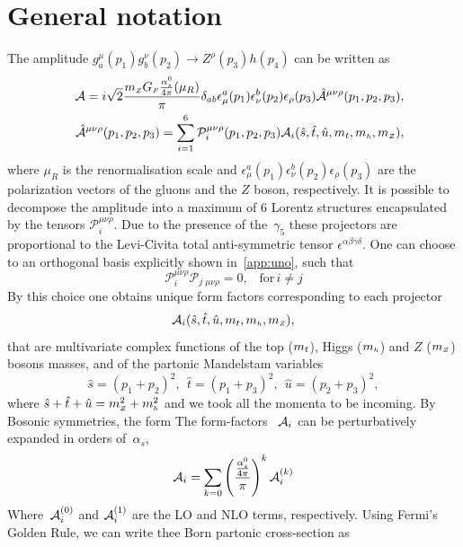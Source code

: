 \section{General notation \label{chap6sec:GenNot} }
\par The amplitude  $g^\mu_a(p_1)g^\nu_b(p_2)\to Z^\rho(p_3) h(p_4)$ can be written as
\begin{align}
&&{\cal A}=i \sqrt{2}\frac{m_{ \scriptscriptstyle Z} G_{ \scriptscriptstyle F} \frac{\alpha_s^0}{4 \pi}(\mu_R)}{\pi}\delta_{ab}\epsilon^a_\mu(p_1)
\epsilon^b_\nu(p_2)\epsilon_\rho(p_3)\hat{{\cal A}}^{\mu\nu\rho}(p_1,p_2,p_3 ),\\
&&\hat{{\cal A}}^{\mu\nu\rho}(p_1,p_2,p_3 )=\sum_{i=1}^{6}
\mathcal{P}_i^{\mu\nu\rho}(p_1,p_2,p_3 )
{\cal A}_i(\hat{s},\hat{t},\hat{u},m_t,m_{ \scriptscriptstyle h},m_{ \scriptscriptstyle Z}),
\label{eq:amp}
\end{align}
where  $\mu_R$ is the renormalisation scale and
$\epsilon^a_\mu(p_1)\epsilon^b_\nu(p_2)\epsilon_\rho(p_3)$ are the
polarization vectors of the gluons and the $Z$ boson, respectively.  It is possible to decompose the amplitude into a maximum of $6$ Lorentz structures encapsulated by the 
tensors $\mathcal{P}_i^{\mu\nu\rho}$. Due to the presence of the~$\gamma_5$ these projectors are
proportional to the Levi-Civita total anti-symmetric tensor
$\epsilon^{\alpha\beta\gamma\delta}$. One can choose to an orthogonal basis explicitly shown in~\autoref{app:uno}, such that
\begin{equation}
	\mathcal{P}_i^{\mu\nu\rho} \mathcal{P}_j\,_{\mu\nu\rho} = 0, \,\,\, \,\, \text{for}\, i \neq j 
\end{equation}
By this choice one obtains unique form factors corresponding to each projector
\begin{equation}
{\cal A}_i(\hat{s},\hat{t},\hat{u},m_t,m_{ \scriptscriptstyle h},m_{ \scriptscriptstyle Z}),
\end{equation}
 that are multivariate complex functions of the
top ($m_t$), Higgs ($m_{ \scriptscriptstyle h}$) and $Z$ ($m_{ \scriptscriptstyle Z}$) bosons masses, and of
the partonic Mandelstam variables
\begin{equation}
\hat{s}=(p_1+p_2)^2,~~ \hat{t}=(p_1+p_3)^2,~~ \hat{u}=(p_2+p_3)^2,
\end{equation}
where $\hat{s}+\hat{t}+\hat{u}=m_{ \scriptscriptstyle Z}^2+m_{ \scriptscriptstyle h}^2$ and we took all the momenta to
be incoming. By Bosonic symmetries, the form
The form-factors~ ${\cal A}_i$ can be perturbatively expanded in orders of~$\alpha_s$, 
\begin{equation}
{\cal A}_{i} = \sum_{k=0} \left(\frac{\frac{\alpha_s^0}{4 \pi}}{\pi} \right) ^k {\cal A}_i^{(k)}
\label{eq:ampexp}
\end{equation}
Where~${\cal A}_i^{(0)}$ and ${\cal A}_i^{(1)}$ are the LO and NLO terms, respectively. Using Fermi's Golden Rule, we can write thee Born partonic cross-section as
